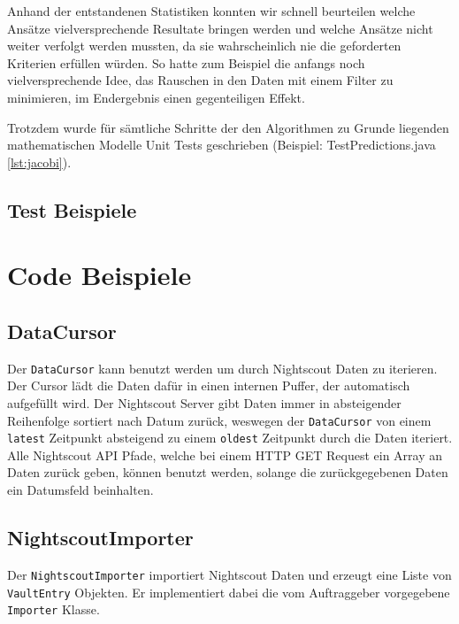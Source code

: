 \documentclass[accentcolor=tud0b,12pt,paper=a4]{tudreport}
\begin{document}
Anhand der entstandenen Statistiken konnten wir schnell beurteilen welche Ansätze vielversprechende Resultate bringen werden und welche Ansätze nicht weiter verfolgt werden mussten, da sie wahrscheinlich nie die geforderten Kriterien erfüllen würden. So hatte zum Beispiel die anfangs noch vielversprechende Idee, das Rauschen in den Daten mit einem Filter zu minimieren, im Endergebnis einen gegenteiligen Effekt.

Trotzdem wurde für sämtliche Schritte der den Algorithmen zu Grunde liegenden mathematischen Modelle Unit Tests geschrieben (Beispiel: TestPredictions.java \ref{lst:jacobi}).

\subsection{Test Beispiele}









\section{Code Beispiele}
\subsection{DataCursor}
Der \texttt{DataCursor} kann benutzt werden um durch Nightscout Daten zu iterieren. Der Cursor lädt die Daten dafür in einen internen Puffer, der automatisch aufgefüllt wird. Der Nightscout Server gibt Daten immer in absteigender Reihenfolge sortiert nach Datum zurück, weswegen der \texttt{DataCursor} von einem \texttt{latest} Zeitpunkt absteigend zu einem \texttt{oldest} Zeitpunkt durch die Daten iteriert. Alle Nightscout API Pfade, welche bei einem HTTP GET Request ein Array an Daten zurück geben, können benutzt werden, solange die zurückgegebenen Daten ein Datumsfeld beinhalten.


\subsection{NightscoutImporter}
Der \texttt{NightscoutImporter} importiert Nightscout Daten und erzeugt eine Liste von \texttt{VaultEntry} Objekten. Er implementiert dabei die vom Auftraggeber vorgegebene \texttt{Importer} Klasse.

\end{document}
